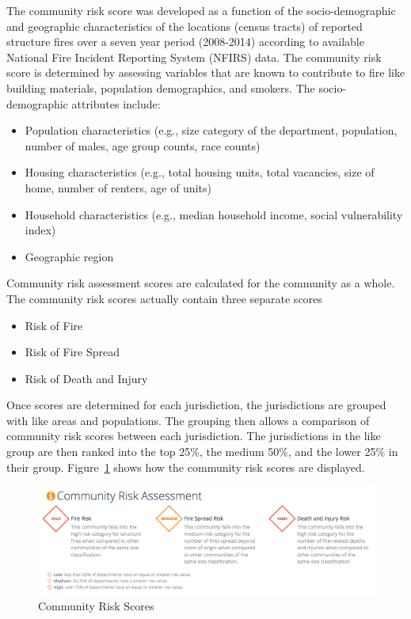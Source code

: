 \documentclass[12pt,oneside]{book}
\begin{document}
The community risk score was developed as a function of the socio-demographic and geographic characteristics of the locations (census tracts) of reported structure fires over a seven year period (2008-2014) according to available National Fire Incident Reporting System (NFIRS) data. The community risk score is determined by assessing variables that are known to contribute to fire like building materials, population demographics, and smokers. The socio-demographic attributes include:

\begin{itemize}
\item Population characteristics (e.g., size category of the department, population, number of males, age group counts, race counts)
\item Housing characteristics (e.g., total housing units, total vacancies, size of home, number of renters, age of units)
\item Household characteristics (e.g., median household income, social vulnerability index)
\item Geographic region
\end{itemize}

Community risk assessment scores are calculated for the community as a whole. The community risk scores actually contain three separate scores 

\begin{itemize}
\item Risk of Fire
\item Risk of Fire Spread
\item Risk of Death and Injury
\end{itemize}

Once scores are determined for each jurisdiction, the jurisdictions are grouped with like areas and populations.  The grouping then allows a comparison of community risk scores between each jurisdiction.  The jurisdictions in the like group are then ranked into the top 25\%, the medium 50\%, and the lower 25\% in their group. Figure~\ref{fig:risk} shows how the community risk scores are displayed.

\begin{figure}[ht!]
\centering
\includegraphics[width=.9\columnwidth]{Figures/risk}
\caption{Community Risk Scores}
\label{fig:risk}
\end{figure}
\end{document}
